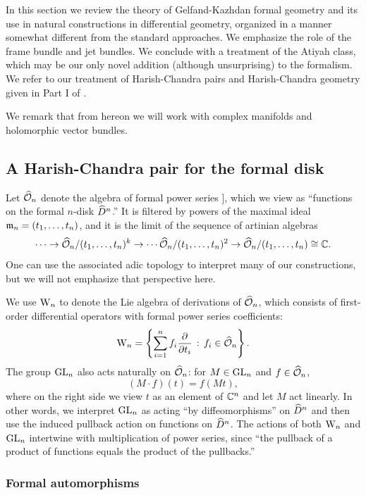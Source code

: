 \documentclass[10pt]{amsart}
\begin{document}
In this section we review the theory of Gelfand-Kazhdan formal geometry and its use in natural constructions in differential geometry, organized in a manner somewhat different from the standard approaches.
We emphasize the role of the frame bundle and jet bundles.
We conclude with a treatment of the Atiyah class, which may be our only novel addition (although unsurprising) to the formalism.
We refer to our treatment of Harish-Chandra pairs and Harish-Chandra geometry given in Part I of \cite{GGW}.

We remark that from hereon we will work with complex manifolds and holomorphic vector bundles.
 
\subsection{A Harish-Chandra pair for the formal disk}

Let $\widehat{\mathcal O}_n$ denote the algebra of formal power series 
\ben
\CC [[ t_1,\ldots,t_n ]],
\een 
which we view as ``functions on the formal $n$-disk $\widehat{D}^n$.'' 
It is filtered by powers of the maximal ideal ${\mathfrak m}_n = (t_1,\ldots,t_n)$, and it is the limit of the sequence of artinian algebras
\[
\cdots \to \widehat{\mathcal O}_n/(t_1,\ldots,t_n)^k \to \cdots \widehat{\mathcal O}_n/(t_1,\ldots,t_n)^2 \to \widehat{\mathcal O}_n/(t_1,\ldots,t_n) \cong \mathbb C.
\] 
One can use the associated adic topology to interpret many of our constructions, but we will not emphasize that perspective here.

We use ${{\rm W}_n}$ to denote the Lie algebra of derivations of $\widehat{\mathcal O}_n$, which consists of first-order differential operators with formal power series coefficients:
\[
{{\rm W}_n} = \left\{ \sum_{i =1 }^n f_i \frac{\partial}{\partial t_i} \,:\, f_i \in \widehat{\mathcal O}_n\right\}.
\]
The group ${\rm GL}_n$ also acts naturally on $\widehat{\mathcal O}_n$: for $M \in {\rm GL}_n$ and $f \in \widehat{\mathcal O}_n$,
\[
(M \cdot f)(t) = f (Mt),
\]
where on the right side we view $t$ as an element of $\mathbb C^n$ and let $M$ act linearly.
In other words, we interpret ${\rm GL}_n$ as acting ``by diffeomorphisms'' on $\widehat{D}^n$ and then use the induced pullback action on functions on $\widehat{D}^n$.
The actions of both ${{\rm W}_n}$ and ${\rm GL}_n$ intertwine with multiplication of power series, 
since ``the pullback of a product of functions equals the product of the pullbacks.''

\subsubsection{Formal automorphisms}
\end{document}
